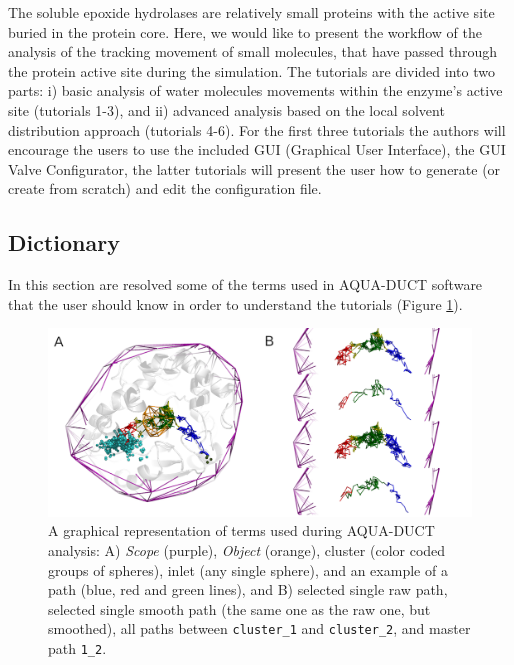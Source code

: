 \documentclass[9pt,tutorial, pubversion]{livecoms}
\begin{document}
The soluble epoxide hydrolases are relatively small proteins with the active site buried in the protein core. Here, we would like to present the workflow of the analysis of the tracking movement of small molecules, that have passed through the protein active site during the simulation. The tutorials are divided into two parts: i) basic analysis of water molecules movements within the enzyme's active site (tutorials 1-3), and ii) advanced analysis based on the local solvent distribution approach (tutorials 4-6). For the first three tutorials the authors will encourage the users to use the included GUI (Graphical User Interface), the GUI Valve Configurator, the latter tutorials will present the user how to generate (or create from scratch) and edit the configuration file.
 
\subsection{Dictionary}

In this section are resolved some of the terms used in AQUA-DUCT software that the user should know in order to understand the tutorials (Figure \ref{Dict}).

\begin{figure}[ht!]
\centering
\includegraphics[width=\textwidth]{dictionary.png}
\caption{A graphical representation of terms used during AQUA-DUCT analysis: A) \emph{Scope} (purple), \emph{Object} (orange), cluster (color coded groups of spheres), inlet (any single sphere), and an example of a path (blue, red and green lines), and B) selected single raw path, selected single smooth path (the same one as the raw one, but smoothed), all paths between \texttt{cluster\_1} and \texttt{cluster\_2}, and master path \texttt{1\_2}.}
\label{Dict}
\end{figure}
\end{document}
